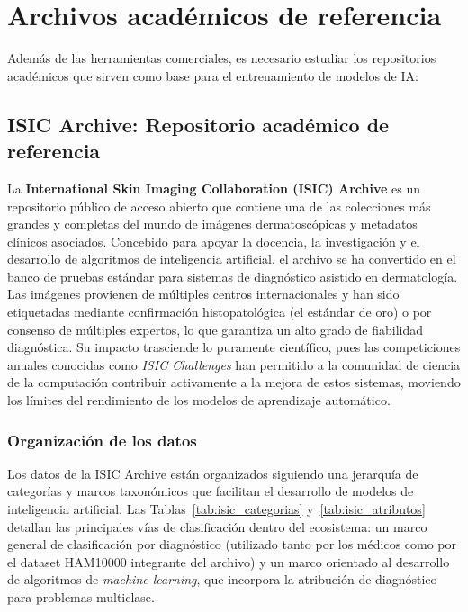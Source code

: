 \section{Archivos acad\'emicos de referencia}
Además de las herramientas comerciales, es necesario estudiar los repositorios 
académicos que sirven como base para el entrenamiento de modelos de IA:

\subsection{ISIC Archive: Repositorio académico de referencia}

La \textbf{International Skin Imaging Collaboration (ISIC) Archive}\cite{isic} es un repositorio 
público de acceso abierto que contiene una de las colecciones más grandes y completas 
del mundo de imágenes dermatoscópicas y metadatos clínicos asociados. Concebido para 
apoyar la docencia, la investigación y el desarrollo de algoritmos de inteligencia 
artificial, el archivo se ha convertido en el banco de pruebas estándar para sistemas 
de diagnóstico asistido en dermatología. Las imágenes provienen de múltiples centros 
internacionales y han sido etiquetadas mediante confirmación histopatológica (el 
estándar de oro) o por consenso de múltiples expertos, lo que garantiza un alto grado 
de fiabilidad diagnóstica. Su impacto trasciende lo puramente científico, pues las 
competiciones anuales conocidas como \textit{ISIC Challenges} han permitido a la 
comunidad de ciencia de la computación contribuir activamente a la mejora de estos 
sistemas, moviendo los límites del rendimiento de los modelos de aprendizaje automático.

\subsubsection{Organización de los datos}

Los datos de la ISIC Archive están organizados siguiendo una jerarquía de categorías 
y marcos taxonómicos que facilitan el desarrollo de modelos de inteligencia artificial. 
Las Tablas~\ref{tab:isic_categorias} y~\ref{tab:isic_atributos} detallan las principales 
vías de clasificación dentro del ecosistema: un marco general de clasificación por 
diagnóstico (utilizado tanto por los médicos como por el dataset HAM10000 integrante 
del archivo) y un marco orientado al desarrollo de algoritmos de \textit{machine learning}, 
que incorpora la atribución de diagnóstico para problemas multiclase.

